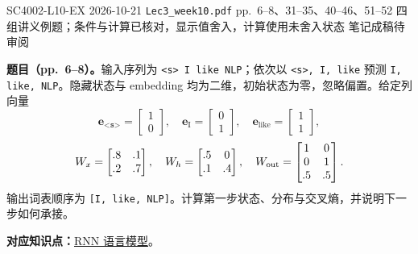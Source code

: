 
\begingroup
\linespread{1.15}\selectfont
\setlength{\parskip}{0.4em}
\renewcommand{\recordid}[1]{}
\renewcommand{\relatedtopic}[2]{\hyperref[topic:#1]{#2}}

\examplemeta
  {SC4002-L10-EX}
  {2026-10-21}
  {\texttt{Lec3\_week10.pdf} pp.~6--8、31--35、40--46、51--52}
  {四组讲义例题；条件与计算已核对，显示值舍入，计算使用未舍入状态}
  {笔记成稿待审阅}

\nopagebreak[4]
\textbf{题目（pp.~6--8）。}输入序列为 \texttt{<s> I like NLP}；依次以 \texttt{<s>, I, like} 预测 \texttt{I, like, NLP}。隐藏状态与 embedding 均为二维，初始状态为零，忽略偏置。给定列向量
\[
 \mathbf e_{\texttt{<s>}}=\begin{bmatrix}1\\0\end{bmatrix},\quad
 \mathbf e_{\text{I}}=\begin{bmatrix}0\\1\end{bmatrix},\quad
 \mathbf e_{\text{like}}=\begin{bmatrix}1\\1\end{bmatrix},
\]
\[
 W_x=\begin{bmatrix}.8&.1\\.2&.7\end{bmatrix},\quad
 W_h=\begin{bmatrix}.5&0\\.1&.4\end{bmatrix},\quad
 W_{\rm out}=\begin{bmatrix}1&0\\0&1\\.5&.5\end{bmatrix}.
\]
输出词表顺序为 \texttt{[I, like, NLP]}。计算第一步状态、分布与交叉熵，并说明下一步如何承接。

\textbf{对应知识点：}\relatedtopic{SC4002-L10-T01}{RNN 语言模型}。

